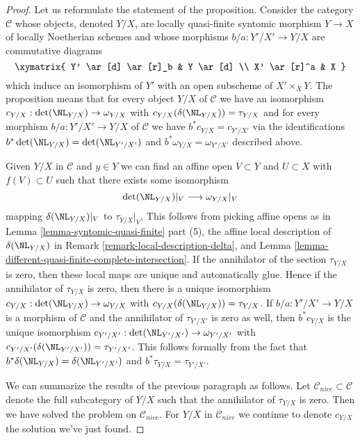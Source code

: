 \begin{proof}
Let us reformulate the statement of the proposition. Consider the category
$\mathcal{C}$ whose objects, denoted $Y/X$, are locally quasi-finite syntomic
morphism $Y \to X$ of locally Noetherian schemes and whose morphisms
$b/a : Y'/X' \to Y/X$ are commutative diagrams
$$
\xymatrix{
Y' \ar[d] \ar[r]_b & Y \ar[d] \\
X' \ar[r]^a & X
}
$$
which induce an isomorphism of $Y'$ with an open subscheme of
$X' \times_X Y$. The proposition means that for every object
$Y/X$ of $\mathcal{C}$ we have an isomorphism
$c_{Y/X} : \det(\NL_{Y/X}) \to \omega_{Y/X}$
with $c_{Y/X}(\delta(\NL_{Y/X})) = \tau_{Y/X}$
and for every morphism $b/a : Y'/X' \to Y/X$ of $\mathcal{C}$ we have
$b^*c_{Y/X} = c_{Y'/X'}$ via the identifications
$b^*\det(\NL_{Y/X}) = \det(\NL_{Y'/X'})$ and
$b^*\omega_{Y/X} = \omega_{Y'/X'}$ described above.

\medskip\noindent
Given $Y/X$ in $\mathcal{C}$ and $y \in Y$ we can find
an affine open $V \subset Y$ and $U \subset X$ with $f(V) \subset U$
such that there exists some isomorphism
$$
\det(\NL_{Y/X})|_V \longrightarrow \omega_{Y/X}|_V
$$
mapping $\delta(\NL_{Y/X})|_V$ to $\tau_{Y/X}|_V$. This follows
from picking affine opens as in
Lemma \ref{lemma-syntomic-quasi-finite} part (5), the affine
local description of $\delta(\NL_{Y/X})$ in
Remark \ref{remark-local-description-delta}, and
Lemma \ref{lemma-different-quasi-finite-complete-intersection}.
If the annihilator of the section $\tau_{Y/X}$ is zero, then
these local maps are unique and automatically glue. Hence if the annihilator
of $\tau_{Y/X}$ is zero, then there is a unique isomorphism
$c_{Y/X} : \det(\NL_{Y/X}) \to \omega_{Y/X}$ with
$c_{Y/X}(\delta(\NL_{Y/X})) = \tau_{Y/X}$.
If $b/a : Y'/X' \to Y/X$ is a morphism of $\mathcal{C}$
and the annihilator of $\tau_{Y'/X'}$ is zero as well,
then $b^*c_{Y/X}$ is the unique isomorphism
$c_{Y'/X'} : \det(\NL_{Y'/X'}) \to \omega_{Y'/X'}$ with
$c_{Y'/X'}(\delta(\NL_{Y'/X'})) = \tau_{Y'/X'}$.
This follows formally from the fact that
$b^*\delta(\NL_{Y/X}) = \delta(\NL_{Y'/X'})$ and
$b^*\tau_{Y/X} = \tau_{Y'/X'}$.

\medskip\noindent
We can summarize the results of the previous paragraph as follows.
Let $\mathcal{C}_{nice} \subset \mathcal{C}$ denote the
full subcategory of $Y/X$ such that the annihilator of
$\tau_{Y/X}$ is zero. Then we have solved the problem
on $\mathcal{C}_{nice}$. For $Y/X$ in $\mathcal{C}_{nice}$
we continue to denote $c_{Y/X}$ the solution we've just found.


\end{proof}
